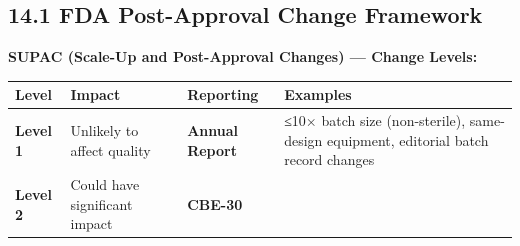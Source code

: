 \documentclass[
  11pt,
  a4paper,
]{report}
\begin{document}
\hypertarget{fda-post-approval-change-framework}{%
\subsection{14.1 FDA Post-Approval Change
Framework}\label{fda-post-approval-change-framework}}

\textbf{SUPAC (Scale-Up and Post-Approval Changes) --- Change Levels:}

\begin{longtable}[]{@{}llll@{}}
\toprule
\begin{minipage}[b]{0.17\columnwidth}\raggedright
Level\strut
\end{minipage} & \begin{minipage}[b]{0.20\columnwidth}\raggedright
Impact\strut
\end{minipage} & \begin{minipage}[b]{0.27\columnwidth}\raggedright
Reporting\strut
\end{minipage} & \begin{minipage}[b]{0.25\columnwidth}\raggedright
Examples\strut
\end{minipage}\tabularnewline
\midrule
\endhead
\begin{minipage}[t]{0.17\columnwidth}\raggedright
\textbf{Level 1}\strut
\end{minipage} & \begin{minipage}[t]{0.20\columnwidth}\raggedright
Unlikely to affect quality\strut
\end{minipage} & \begin{minipage}[t]{0.27\columnwidth}\raggedright
\textbf{Annual Report}\strut
\end{minipage} & \begin{minipage}[t]{0.25\columnwidth}\raggedright
≤10× batch size (non-sterile), same-design equipment, editorial batch
record changes\strut
\end{minipage}\tabularnewline
\begin{minipage}[t]{0.17\columnwidth}\raggedright
\textbf{Level 2}\strut
\end{minipage} & \begin{minipage}[t]{0.20\columnwidth}\raggedright
Could have significant impact\strut
\end{minipage} & \begin{minipage}[t]{0.27\columnwidth}\raggedright
\textbf{CBE-30}\strut
\end{minipage} & \begin{minipage}[t]{0.25\columnwidth}\raggedright

\end{minipage}
\end{longtable}
\end{document}
